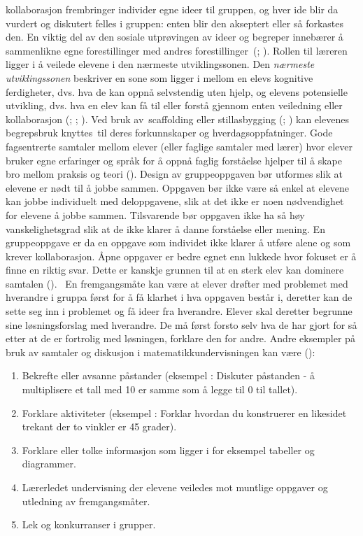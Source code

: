 \documentclass[12pt,twoside,onecolumn,norsk]{article}
\begin{document}
kollaborasjon frembringer individer egne ideer til gruppen, og hver ide blir da 
vurdert og diskutert felles i gruppen: enten blir den akseptert eller så forkastes 
den. En viktig del av den sosiale utprøvingen av ideer og begreper innebærer å 
sammenlikne egne forestillinger med andres forestillinger (; 
).
\newline
\newline
Rollen til læreren ligger i å veilede elevene i den nærmeste utviklingssonen. 
Den \emph{nærmeste utviklingssonen} beskriver en sone som ligger i mellom en elevs 
kognitive ferdigheter, dvs. hva de kan oppnå selvstendig uten hjelp, og elevens 
potensielle utvikling, dvs. hva en elev kan få til eller forstå gjennom enten 
veiledning eller kollaborasjon (; ; 
). Ved bruk av scaffolding eller 
stillasbygging (; ) kan elevenes begrepsbruk 
knyttes til deres forkunnskaper og hverdagsoppfatninger. Gode fagsentrerte 
samtaler mellom elever (eller faglige samtaler med lærer) hvor elever bruker 
egne erfaringer og språk for å oppnå faglig forståelse hjelper til å skape bro 
mellom praksis og teori ().
\newline
\newline
Design av gruppeoppgaven bør utformes slik at elevene er nødt til å jobbe sammen. 
Oppgaven bør ikke være så enkel at elevene kan jobbe individuelt med deloppgavene, 
slik at det ikke er noen nødvendighet for elevene å jobbe sammen. Tilsvarende bør 
oppgaven ikke ha så høy vanskelighetsgrad slik at de ikke klarer å danne forståelse 
eller mening. En gruppeoppgave er da en oppgave som individet ikke klarer å utføre 
alene og som krever kollaborasjon. Åpne oppgaver er bedre egnet enn lukkede hvor 
fokuset er å finne en riktig svar. Dette er kanskje grunnen til at en sterk elev 
kan dominere samtalen ().  En fremgangsmåte kan være at 
elever drøfter med problemet med hverandre i gruppa først for å få klarhet i hva 
oppgaven består i, deretter kan de sette seg inn i problemet og få ideer fra 
hverandre. Elever skal deretter begrunne sine løsningsforslag med hverandre. De må 
først forsto selv hva de har gjort for så etter at de er fortrolig med løsningen, 
forklare den for andre. Andre eksempler på bruk av samtaler og diskusjon i 
matematikkundervisningen kan være ():
\begin{enumerate}
\item Bekrefte eller avsanne påstander (eksempel : Diskuter påstanden - å multiplisere 
et tall med 10 er samme som å legge til 0 til tallet).
\item Forklare aktiviteter (eksempel : Forklar hvordan du konstruerer en likesidet 
trekant der to vinkler er 45 grader).
\item Forklare eller tolke informasjon som ligger i for eksempel tabeller og 
diagrammer.
\item Lærerledet undervisning der elevene veiledes mot muntlige oppgaver og utledning 
av fremgangsmåter.
\item Lek og konkurranser i grupper.
\end{enumerate}
\end{document}

